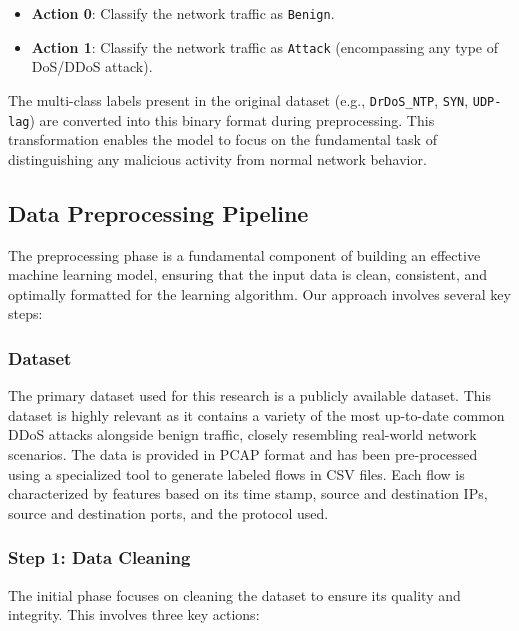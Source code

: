 \documentclass{report}
\begin{document}
\begin{itemize}
  \item \textbf{Action 0}: Classify the network traffic as \texttt{Benign}.
  \item \textbf{Action 1}: Classify the network traffic as \texttt{Attack} (encompassing any type of DoS/DDoS attack).
\end{itemize}

The multi-class labels present in the original dataset (e.g., \texttt{DrDoS\_NTP}, \texttt{SYN}, \texttt{UDP-lag}) are converted into this binary format during preprocessing. This transformation enables the model to focus on the fundamental task of distinguishing any malicious activity from normal network behavior.


\subsection{Data Preprocessing Pipeline}

The preprocessing phase is a fundamental component of building an effective machine learning model, ensuring that the input data is clean, consistent, and optimally formatted for the learning algorithm. Our approach involves several key steps:

\subsubsection{Dataset}

The primary dataset used for this research is a publicly available dataset. This dataset is highly relevant as it contains a variety of the most up-to-date common DDoS attacks alongside benign traffic, closely resembling real-world network scenarios. The data is provided in PCAP format and has been pre-processed using a specialized tool to generate labeled flows in CSV files. Each flow is characterized by features based on its time stamp, source and destination IPs, source and destination ports, and the protocol used.

\subsubsection{Step 1: Data Cleaning}
The initial phase focuses on cleaning the dataset to ensure its quality and integrity. This involves three key actions:
\end{document}
